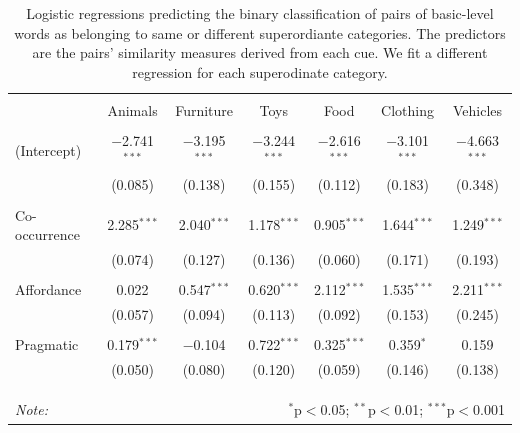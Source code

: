 \documentclass[10pt, letterpaper]{article}
\begin{document}
\begin{table}[!htbp] \centering 
  \caption{Logistic regressions predicting the binary classification of pairs of basic-level words as belonging to same or different superordiante categories. The predictors are the pairs' similarity measures derived from each cue. We fit a different regression for each superodinate category.} 
  \label{} 
\begin{tabular}{@{\extracolsep{5pt}}lcccccc} 
\hline 
 & \multicolumn{6}{c}{} \\
 & Animals & Furniture & Toys & Food & Clothing & Vehicles \\ 
\hline \\[-1.8ex] 
 (Intercept) & $-$2.741$^{***}$ & $-$3.195$^{***}$ & $-$3.244$^{***}$ & $-$2.616$^{***}$ & $-$3.101$^{***}$ & $-$4.663$^{***}$ \\ 
  & (0.085) & (0.138) & (0.155) & (0.112) & (0.183) & (0.348) \\ 
  & & & & & & \\ 
 Co-occurrence & 2.285$^{***}$ & 2.040$^{***}$ & 1.178$^{***}$ & 0.905$^{***}$ & 1.644$^{***}$ & 1.249$^{***}$ \\ 
  & (0.074) & (0.127) & (0.136) & (0.060) & (0.171) & (0.193) \\ 
  & & & & & & \\ 
 Affordance & 0.022 & 0.547$^{***}$ & 0.620$^{***}$ & 2.112$^{***}$ & 1.535$^{***}$ & 2.211$^{***}$ \\ 
  & (0.057) & (0.094) & (0.113) & (0.092) & (0.153) & (0.245) \\ 
  & & & & & & \\ 
 Pragmatic & 0.179$^{***}$ & $-$0.104 & 0.722$^{***}$ & 0.325$^{***}$ & 0.359$^{*}$ & 0.159 \\ 
  & (0.050) & (0.080) & (0.120) & (0.059) & (0.146) & (0.138) \\ 
  & & & & & & \\ 
 \\[-1.8ex] 

\hline \\[-1.8ex] 
\textit{Note:}  & \multicolumn{6}{r}{$^{*}$p$<$0.05; $^{**}$p$<$0.01; $^{***}$p$<$0.001} \\ 
\end{tabular} 
\end{table}


\end{document}

